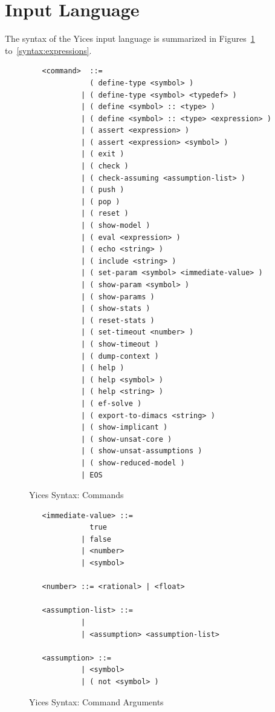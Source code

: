 \documentclass[11pt,twoside,fleqn,openright,titlepage]{cslreport}
\begin{document}
\section{Input Language}

The   syntax  of   the   Yices  input   language   is  summarized   in
Figures~\ref{syntax:commands} to~\ref{syntax:expressions}.


\begin{figure}
\begin{small}
\begin{verbatim}
   <command>  ::=
              ( define-type <symbol> )
            | ( define-type <symbol> <typedef> )
            | ( define <symbol> :: <type> )
            | ( define <symbol> :: <type> <expression> )
            | ( assert <expression> )
            | ( assert <expression> <symbol> )
            | ( exit )
            | ( check )
            | ( check-assuming <assumption-list> )
            | ( push )
            | ( pop )
            | ( reset )
            | ( show-model )
            | ( eval <expression> )
            | ( echo <string> )
            | ( include <string> )
            | ( set-param <symbol> <immediate-value> )
            | ( show-param <symbol> )
            | ( show-params )
            | ( show-stats )
            | ( reset-stats )
            | ( set-timeout <number> )
            | ( show-timeout )
            | ( dump-context )
            | ( help )
            | ( help <symbol> )
            | ( help <string> )
            | ( ef-solve )
            | ( export-to-dimacs <string> )
            | ( show-implicant )
            | ( show-unsat-core )
            | ( show-unsat-assumptions )
            | ( show-reduced-model )
            | EOS

\end{verbatim}
\end{small}
\caption{Yices Syntax: Commands}
\label{syntax:commands}
\end{figure}

\begin{figure}
\begin{small}
\begin{verbatim}
   <immediate-value> ::=
              true
            | false
            | <number>
            | <symbol>

   <number> ::= <rational> | <float>

   <assumption-list> ::=
            |
            | <assumption> <assumption-list>

   <assumption> ::=
            | <symbol>
            | ( not <symbol> )

\end{verbatim}
\end{small}
\caption{Yices Syntax: Command Arguments}
\end{figure}
\end{document}
